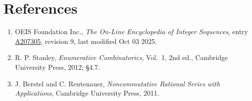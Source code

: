 \documentclass[11pt]{article}
\theoremstyle{definition}
\begin{document}
\section{References}

\begin{enumerate}

\item OEIS Foundation Inc., \emph{The On-Line Encyclopedia of Integer Sequences}, entry \href{https://oeis.org/A207305}{A207305}, revision 9, last modified Oct 03 2025.

\item R. P. Stanley, \emph{Enumerative Combinatorics}, Vol.~1, 2nd ed., Cambridge University Press, 2012; \S4.7.

\item J. Berstel and C. Reutenauer, \emph{Noncommutative Rational Series with Applications}, Cambridge University Press, 2011.

\end{enumerate}
\end{document}
